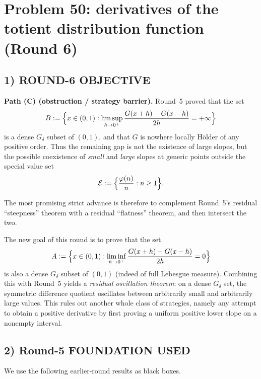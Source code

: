 \section{Problem 50: derivatives of the totient distribution function (Round 6)}

\subsection{1) ROUND-6 OBJECTIVE}

\textbf{Path (C) (obstruction / strategy barrier).}
Round~5 proved that the set
\[
B:=\Bigl\{x\in(0,1):\limsup_{h\to0^+}\frac{G(x+h)-G(x-h)}{2h}=+\infty\Bigr\}
\]
is a dense $G_\delta$ subset of $(0,1)$, and that $G$ is nowhere locally H\"older of any positive order. Thus the remaining gap is not the existence of large slopes, but the possible coexistence of \emph{small} and \emph{large} slopes at generic points outside the special value set
\[
\mathcal E:=\Bigl\{\frac{\varphi(n)}{n}:n\ge1\Bigr\}.
\]

The most promising strict advance is therefore to complement Round~5's residual ``steepness'' theorem with a residual ``flatness'' theorem, and then intersect the two.

The new goal of this round is to prove that the set
\[
A:=\Bigl\{x\in(0,1):\liminf_{h\to0^+}\frac{G(x+h)-G(x-h)}{2h}=0\Bigr\}
\]
is also a dense $G_\delta$ subset of $(0,1)$ (indeed of full Lebesgue measure). Combining this with Round~5 yields a \emph{residual oscillation theorem}: on a dense $G_\delta$ set, the symmetric difference quotient oscillates between arbitrarily small and arbitrarily large values. This rules out another whole class of strategies, namely any attempt to obtain a positive derivative by first proving a uniform positive lower slope on a nonempty interval.

\subsection{2) Round-5 FOUNDATION USED}

We use the following earlier-round results as black boxes.

